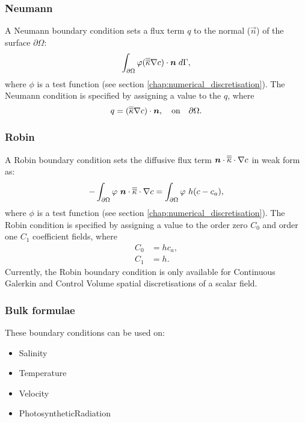 \subsubsection{Neumann}

A Neumann boundary condition sets a flux term $q$ to the normal ($\vec n$) of the surface $\partial\Omega$:
\begin{equation*}
\int_{\partial\Omega} \varphi (\overline{\overline{\kappa}}\nabla c)\cdot{\mbox{\boldmath$n$}} \;d\Gamma,
\end{equation*}
where $\phi$ is a test function (see section \ref{chap:numerical_discretisation}).
The Neumann condition is specified by assigning a value to the $q$, where
\begin{equation*}
q = (\overline{\overline{\kappa}}\nabla c)\cdot{\mbox{\boldmath$n$}},\quad \textrm{on}\quad \partial\Omega.
\end{equation*}

\subsubsection{Robin}

A Robin boundary condition sets the diffusive flux term  ${\mbox{\boldmath$n$}}\cdot\overline{\overline{\kappa}}\cdot\nabla c$ in weak form as:
\begin{equation*}
- \int_{\partial\Omega} \varphi~{\mbox{\boldmath$n$}}\cdot\overline{\overline{\kappa}}\cdot\nabla c =
    \int_{\partial\Omega} \varphi~h(c-c_{a}),
\end{equation*}
where $\phi$ is a test function (see section \ref{chap:numerical_discretisation}).
The Robin condition is specified by assigning a value to the order zero $C_{0}$ and order one $C_{1}$ coefficient fields, where
\begin{align}
   C_{0} &= hc_{a}, \\
   C_{1} &= h.
\end{align}
Currently, the Robin boundary condition is only available for Continuous Galerkin and Control Volume 
spatial discretisations of a scalar field. 

\subsubsection{Bulk formulae}\label{sec:bulk_formulae}

These boundary conditions can be used on:
\begin{itemize}
\item Salinity
\item Temperature
\item Velocity
\item PhotosyntheticRadiation
\end{itemize}

